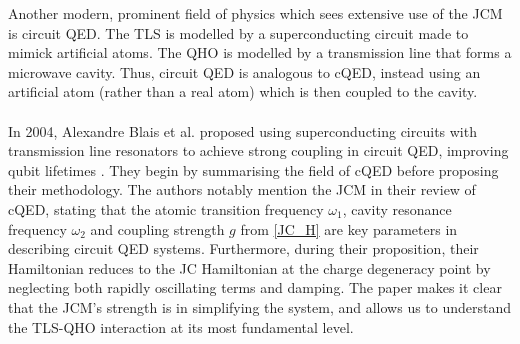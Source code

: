 \documentclass[12pt,a4paper]{article}
\begin{document}
Another modern, prominent field of physics which sees extensive use of the JCM is circuit QED. The TLS is modelled by a superconducting circuit made to mimick artificial atoms. The QHO is modelled by a transmission line that forms a microwave cavity. Thus, circuit QED is analogous to cQED, instead using an artificial atom  (rather than a real atom) which is then coupled to the cavity. \\
\\
In 2004, Alexandre Blais et al. proposed using superconducting circuits with transmission line resonators to achieve strong coupling in circuit QED, improving qubit lifetimes \cite{Context2004-CQED_JCM}. They begin by summarising the field of cQED before proposing their methodology. The authors notably mention the JCM in their review of cQED, stating that the atomic transition frequency $\omega_1$, cavity resonance frequency $\omega_2$ and coupling strength $g$ from \eqref{JC_H} are key parameters in describing circuit QED systems. Furthermore, during their proposition, their Hamiltonian reduces to the JC Hamiltonian at the charge degeneracy point by neglecting both rapidly oscillating terms and damping. The paper makes it clear that the JCM's strength is in simplifying the system, and allows us to understand the TLS-QHO interaction at its most fundamental level. \\
\end{document}
